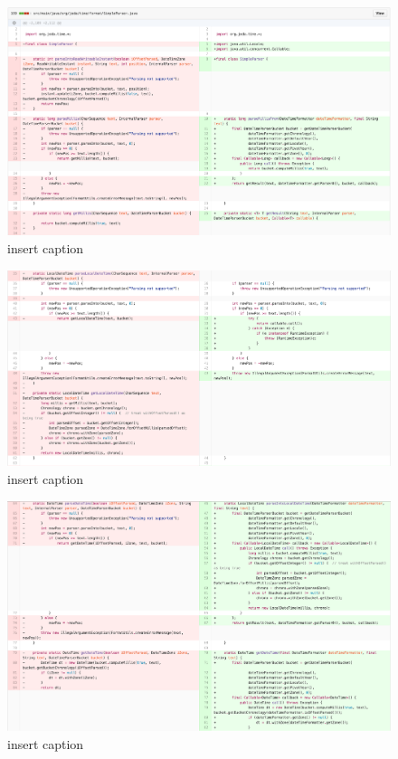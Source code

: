 \begin{figure}[H]
	\centering
	\includegraphics[width=\linewidth]{code98}
	\caption{insert caption}
\end{figure}
\begin{figure}[H]
	\centering
	\includegraphics[width=\linewidth]{code99}
	\caption{insert caption}
\end{figure}
\begin{figure}[H]
	\centering
	\includegraphics[width=\linewidth]{code100}
	\caption{insert caption}
\end{figure}
